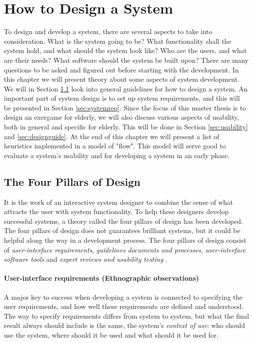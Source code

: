 \chapter{How to Design a System}
To design and develop a system, there are several aspects to take into consideration. What is the system going to be? What functionality shall the system hold, and what should the system look like? Who are the users, and what are their needs? What software should the system be built upon? There are many questions to be asked and figured out before starting with the development. In this chapter we will present theory about some aspects of system development. We will in Section \ref{sec:fourpillarsofdesign} look into general guidelines for how to design a system. An important part of system design is to set up system requirements, and this will be presented in Section \ref{sec:systemreq}. Since the focus of this master thesis is to design an exergame for elderly, we will also discuss various aspects of usability, both in general and specific for elderly. This will be done in Section \ref{sec:usability} and \ref{sec:designguide}. At the end of this chapter we will present a list of heuristics implemented in a model of "flow". This model will serve good to evaluate a system's usability and for developing a system in an early phase.

\section{The Four Pillars of Design}
\label{sec:fourpillarsofdesign}
It is the work of an interactive system designer to combine the sense of what attracts the user with system functionality. To help these designers develop successful systems, a theory called the four pillars of design has been developed. The four pillars of design does not guarantees brilliant systems, but it could be helpful along the way in a development process. The four pillars of design consist of \emph{user-interface requirements}, \emph{guidelines documents and processes}, \emph{user-interface software tools} and \emph{expert reviews and usability testing} \cite{mmi}.    

\subsubsection{User-interface requirements (Ethnographic observations)}   
A major key to success when developing a system is connected to specifying the user requirements, and how well these requirements are defined and understood. The way to specify requirements differs from system to system, but what the final result always should include is the same, the system's \emph{context of use}: who should use the system, where should it be used and what should it be used for. 

